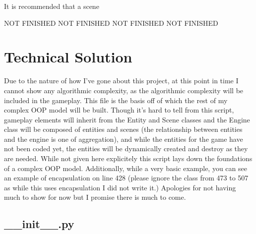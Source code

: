 \documentclass{report}
\begin{document}
It is recommended that a scene 

NOT FINISHED NOT FINISHED NOT FINISHED NOT FINISHED

\section{Technical Solution}

Due to the nature of how I've gone about this project, at this point in time I cannot show any algorithmic complexity, as the algorithmic complexity will be included in the gameplay. This file is the basis off of which the rest of my complex OOP model will be built. Though it's hard to tell from this script, gameplay elements will inherit from the Entity and Scene classes and the Engine class will be composed of entities and scenes (the relationship between entities and the engine is one of aggregation), and while the entities for the game have not been coded yet, the entities will be dynamically created and destroy as they are needed. While not given here explicitely this script lays down the foundations of a complex OOP model. Additionally, while a very basic example, you can see an example of encapsulation on line 428 (please ignore the class from 473 to 507 as while this uses encapsulation I did not write it.)
Apologies for not having much to show for now but I promise there is much to come.

\subsection{\_\_init\_\_.py}
\end{document}
